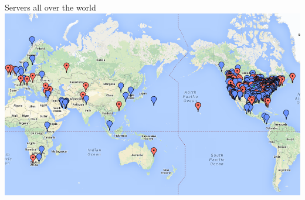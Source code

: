 \documentclass{beamer}
\begin{document}
\begin{frame}{Servers all over the world}
\includegraphics[width=\textwidth]{mapWorld}

\end{frame}

\end{document}
